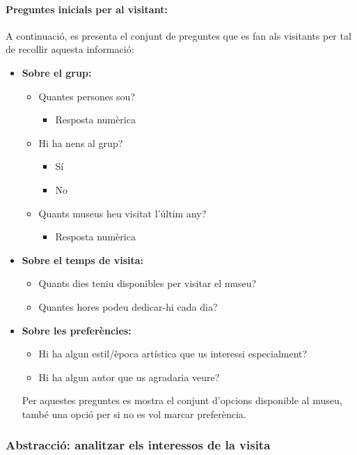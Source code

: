 \documentclass[a4paper]{article}
\begin{document}
	\paragraph{Preguntes inicials per al visitant:}
	A continuació, es presenta el conjunt de preguntes que es fan als visitants per tal de recollir aquesta informació:
	\begin{itemize}
		\item \textbf{Sobre el grup:}
		\begin{itemize}
			\item Quantes persones sou? 
			\begin{itemize}
				\item Resposta numèrica
			\end{itemize}
			\item Hi ha nens al grup? 
			\begin{itemize}
				\item Sí
				\item No
			\end{itemize}
			\item Quants museus heu visitat l'últim any? 
			\begin{itemize}
				\item Resposta numèrica
			\end{itemize}
		\end{itemize}
		
		\item \textbf{Sobre el temps de visita:}
		\begin{itemize}
			\item Quants dies teniu disponibles per visitar el museu?
			\item Quantes hores podeu dedicar-hi cada dia?
		\end{itemize}
		
		\item \textbf{Sobre les preferències:}
		\begin{itemize}
			\item Hi ha algun estil/època artística que us interessi especialment?
			\item Hi ha algun autor que us agradaria veure?
		\end{itemize}
		Per aquestes preguntes es mostra el conjunt d'opcions disponible al museu, també una opció per si no es vol marcar preferència.
	\end{itemize}

	
	\subsubsection{Abstracció: analitzar els interessos de la visita}
	
\end{document}
